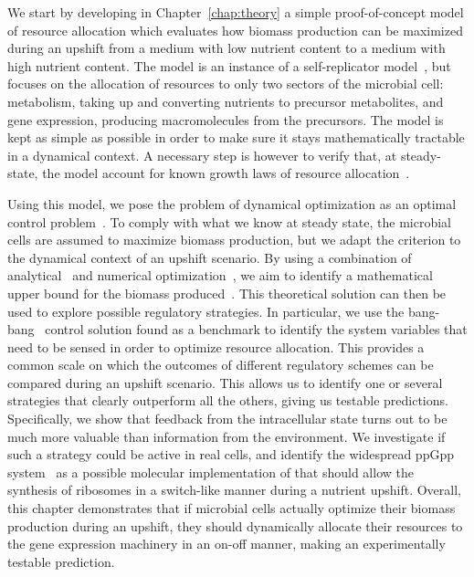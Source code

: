 We start by developing in Chapter~\ref{chap:theory} a simple proof-of-concept model of resource allocation which evaluates how biomass production can be maximized during an upshift from a medium with low nutrient content to a medium with high nutrient content.
The model is an instance of a self-replicator model~\cite{molenaar_shifts_2009}, but focuses on the allocation of resources to only two sectors of the microbial cell: metabolism, taking up and converting nutrients to precursor metabolites, and gene expression, producing macromolecules from the precursors.
The model is kept as simple as possible in order to make sure it stays mathematically tractable in a dynamical context.
A necessary step is however to verify that, at steady-state, the model account for known growth laws of resource allocation~\cite{scott_interdependence_2010,scott_bacterial_2011}.

Using this model, we pose the problem of dynamical optimization as an optimal control problem~\cite{stengel_optimal_1994}.
To comply with what we know at steady state, the microbial cells are assumed to maximize biomass production, but we adapt the criterion to the dynamical context of an upshift scenario.
By using a combination of analytical~\cite{carlson_infinite_1991} and numerical optimization~\cite{bonnans_bocop_2012}, we aim to identify a mathematical upper bound for the biomass produced~\cite{stengel_optimal_1994}.
This theoretical solution can then be used to explore possible regulatory strategies.
In particular, we use the bang-bang~\cite{stengel_optimal_1994} control solution found as a benchmark to identify the system variables that need to be sensed in order to optimize resource allocation.
This provides a common scale on which the outcomes of different regulatory schemes can be compared during an upshift scenario.
This allows us to identify one or several strategies that clearly outperform all the others, giving us testable predictions.
Specifically, we show that feedback from the intracellular state turns out to be much more valuable than information from the environment.
We investigate if such a strategy could be active in real cells, and identify the widespread ppGpp system~\cite{bosdriesz_how_2015} as a possible molecular implementation of that should allow the synthesis of ribosomes in a switch-like manner during a nutrient upshift.
Overall, this chapter demonstrates that if microbial cells actually optimize their biomass production during an upshift, they should dynamically allocate their resources to the gene expression machinery in an on-off manner, making an experimentally testable prediction.

